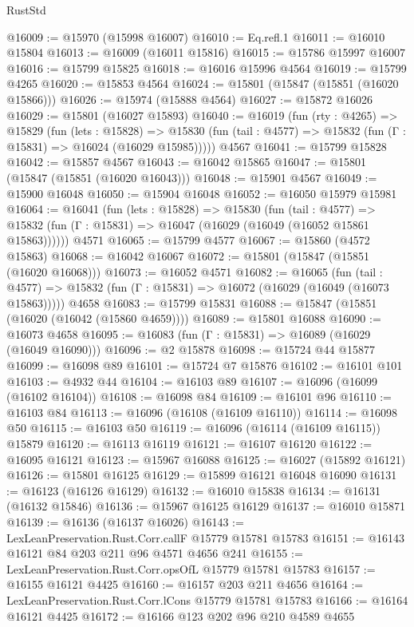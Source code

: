 \begin{lexlean}{RustStd}
\begin{coremodule}
@16009 := @15970 (@15998 @16007)
@16010 := Eq.refl.{1}
@16011 := @16010 @15804
@16013 := @16009 (@16011 @15816)
@16015 := @15786 @15997 @16007
@16016 := @15799 @15825
@16018 := @16016 @15996 @4564
@16019 := @15799 @4265
@16020 := @15853 @4564
@16024 := @15801 (@15847 (@15851 (@16020 @15866)))
@16026 := @15974 (@15888 @4564)
@16027 := @15872 @16026
@16029 := @15801 (@16027 @15893)
@16040 := @16019
    (fun (rty : @4265) =>
    @15829
      (fun (lets : @15828) =>
      @15830 (fun (tail : @4577) => @15832 (fun (Γ : @15831) => @16024 (@16029 @15985)))))
    @4567
@16041 := @15799 @15828
@16042 := @15857 @4567
@16043 := @16042 @15865
@16047 := @15801 (@15847 (@15851 (@16020 @16043)))
@16048 := @15901 @4567
@16049 := @15900 @16048
@16050 := @15904 @16048
@16052 := @16050 @15979 @15981
@16064 := @16041
    (fun (lets : @15828) =>
    @15830
      (fun (tail : @4577) =>
      @15832 (fun (Γ : @15831) => @16047 (@16029 (@16049 (@16052 @15861 @15863))))))
    @4571
@16065 := @15799 @4577
@16067 := @15860 (@4572 @15863)
@16068 := @16042 @16067
@16072 := @15801 (@15847 (@15851 (@16020 @16068)))
@16073 := @16052 @4571
@16082 := @16065
    (fun (tail : @4577) => @15832 (fun (Γ : @15831) => @16072 (@16029 (@16049 (@16073 @15863)))))
    @4658
@16083 := @15799 @15831
@16088 := @15847 (@15851 (@16020 (@16042 (@15860 @4659))))
@16089 := @15801 @16088
@16090 := @16073 @4658
@16095 := @16083 (fun (Γ : @15831) => @16089 (@16029 (@16049 @16090)))
@16096 := @2 @15878
@16098 := @15724 @44 @15877
@16099 := @16098 @89
@16101 := @15724 @7 @15876
@16102 := @16101 @101
@16103 := @4932 @44
@16104 := @16103 @89
@16107 := @16096 (@16099 (@16102 @16104))
@16108 := @16098 @84
@16109 := @16101 @96
@16110 := @16103 @84
@16113 := @16096 (@16108 (@16109 @16110))
@16114 := @16098 @50
@16115 := @16103 @50
@16119 := @16096 (@16114 (@16109 @16115)) @15879
@16120 := @16113 @16119
@16121 := @16107 @16120
@16122 := @16095 @16121
@16123 := @15967 @16088
@16125 := @16027 (@15892 @16121)
@16126 := @15801 @16125
@16129 := @15899 @16121 @16048 @16090
@16131 := @16123 (@16126 @16129)
@16132 := @16010 @15838
@16134 := @16131 (@16132 @15846)
@16136 := @15967 @16125 @16129
@16137 := @16010 @15871
@16139 := @16136 (@16137 @16026)
@16143 := LexLeanPreservation.Rust.Corr.callF @15779 @15781 @15783
@16151 := @16143 @16121 @84 @203 @211 @96 @4571 @4656 @241
@16155 := LexLeanPreservation.Rust.Corr.opsOfL @15779 @15781 @15783
@16157 := @16155 @16121 @4425
@16160 := @16157 @203 @211 @4656
@16164 := LexLeanPreservation.Rust.Corr.lCons @15779 @15781 @15783
@16166 := @16164 @16121 @4425
@16172 := @16166 @123 @202 @96 @210 @4589 @4655

\end{coremodule}
\end{lexlean}
